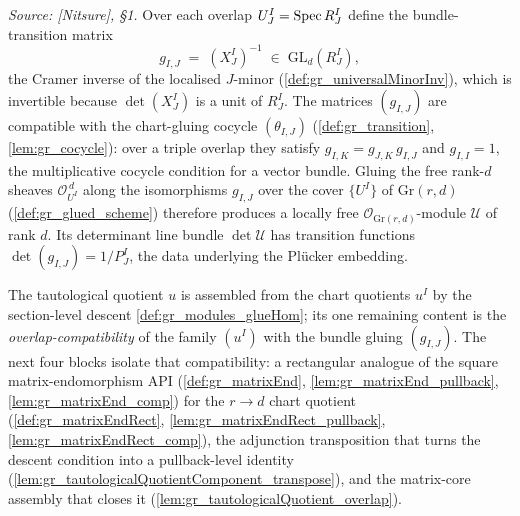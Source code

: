 \begin{definition}\leanok
  \label{def:gr_universal_quotient_sheaf}
  \textit{Source: [Nitsure], \S 1.}
  Over each overlap \(U^I_J = \operatorname{Spec} R^I_J\) define the bundle-transition matrix
  \[
    g_{I,J} \;=\; (X^I_J)^{-1} \;\in\; \mathrm{GL}_d(R^I_J),
  \]
  the Cramer inverse of the localised \(J\)-minor (\cref{def:gr_universalMinorInv}),
  which is invertible because \(\det(X^I_J)\) is a unit of \(R^I_J\). The matrices
  \((g_{I,J})\) are compatible with the chart-gluing cocycle \((\theta_{I,J})\)
  (\cref{def:gr_transition}, \cref{lem:gr_cocycle}): over a triple overlap they
  satisfy \(g_{I,K} = g_{J,K}\, g_{I,J}\) and \(g_{I,I} = 1\), the multiplicative
  cocycle condition for a vector bundle. Gluing the free rank-\(d\) sheaves
  \(\mathcal{O}_{U^I}^{\,d}\) along the isomorphisms \(g_{I,J}\) over the cover
  \(\{U^I\}\) of \(\mathrm{Gr}(r,d)\) (\cref{def:gr_glued_scheme}) therefore
  produces a locally free \(\mathcal{O}_{\mathrm{Gr}(r,d)}\)-module
  \(\mathcal{U}\) of rank \(d\). Its determinant line bundle \(\det \mathcal{U}\)
  has transition functions \(\det(g_{I,J}) = 1/P^I_J\), the data underlying the
  Pl\"ucker embedding.
\end{definition}

The tautological quotient \(u\) is assembled from the chart quotients \(u^I\) by the
section-level descent \cref{def:gr_modules_glueHom}; its one remaining content is the
\emph{overlap-compatibility} of the family \((u^I)\) with the bundle gluing
\((g_{I,J})\). The next four blocks isolate that compatibility: a rectangular analogue of
the square matrix-endomorphism API (\cref{def:gr_matrixEnd},
\cref{lem:gr_matrixEnd_pullback}, \cref{lem:gr_matrixEnd_comp}) for the
\(r \to d\) chart quotient (\cref{def:gr_matrixEndRect},
\cref{lem:gr_matrixEndRect_pullback}, \cref{lem:gr_matrixEndRect_comp}), the
adjunction transposition that turns the descent condition into a pullback-level identity
(\cref{lem:gr_tautologicalQuotientComponent_transpose}), and the matrix-core assembly
that closes it (\cref{lem:gr_tautologicalQuotient_overlap}).

